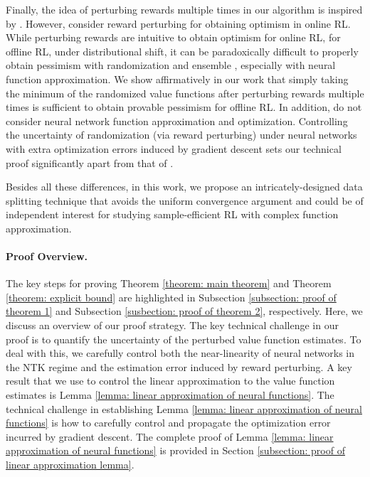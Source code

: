 \documentclass{article} \usepackage{iclr2023/iclr2023_conference,times}
\begin{document}
Finally, the idea of perturbing rewards multiple times in our algorithm is inspired by \cite{ishfaq2021randomized}. However, \citet{ishfaq2021randomized} consider reward perturbing for obtaining optimism in online RL. While perturbing rewards are intuitive to obtain optimism for online RL, for offline RL, under distributional shift, it can be paradoxically difficult to properly obtain pessimism with randomization and ensemble \citep{ghasemipour2022so}, especially with neural function approximation. We show affirmatively in our work that simply taking the minimum of the randomized value functions after perturbing rewards multiple times is sufficient to obtain provable pessimism for offline RL. In addition, \citet{ishfaq2021randomized} do not consider neural network function approximation and optimization. Controlling the uncertainty of randomization (via reward perturbing) under neural networks with extra optimization errors induced by gradient descent sets our technical proof significantly apart from that of \cite{ishfaq2021randomized}. 

Besides all these differences, in this work, we propose an intricately-designed data splitting technique that avoids the uniform convergence argument and could be of independent interest for studying sample-efficient RL with complex function approximation.

\paragraph{Proof Overview.} The key steps for proving Theorem \ref{theorem: main theorem} and Theorem \ref{theorem: explicit bound} are highlighted in Subsection \ref{subsection: proof of theorem 1} and Subsection \ref{susbection: proof of theorem 2}, respectively. Here, we discuss an overview of our proof strategy. The key technical challenge in our proof is to quantify the uncertainty of the perturbed value function estimates. To deal with this, we carefully control both the near-linearity of neural networks in the NTK regime and the estimation error induced by reward perturbing. A key result that we use to control the linear approximation to the value function estimates is Lemma \ref{lemma: linear approximation of neural functions}. The technical challenge in establishing Lemma \ref{lemma: linear approximation of neural functions} is how to carefully control and propagate the optimization error incurred by gradient descent. The complete proof of Lemma \ref{lemma: linear approximation of neural functions} is provided in Section \ref{subsection: proof of linear approximation lemma}. 
\end{document}
